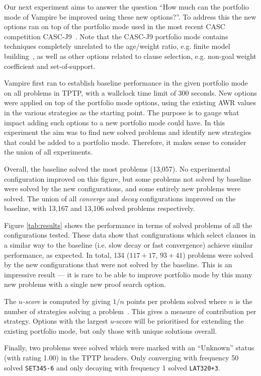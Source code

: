 \documentclass{llncs}
\begin{document}
Our next experiment aims to answer the question ``How much can the portfolio mode of Vampire be improved using these new options?''.
To address this the new options ran on top of the portfolio mode used in the most recent CASC competition CASC-J9~\cite{CASC}.
Note that the CASC-J9 portfolio mode contains techniques completely unrelated to the age/weight ratio, e.g. finite model building~\cite{fmb}, as well as other options related to clause selection, e.g. non-goal weight coefficient and set-of-support.

Vampire first ran to establish baseline performance in the given portfolio mode on all problems in TPTP, with a wallclock time limit of 300 seconds.
New options were applied on top of the portfolio mode options, using the existing AWR values in the various strategies as the starting point.
The purpose is to gauge what impact adding such options to a new portfolio mode could have.
In this experiment the aim was to find new solved problems and identify new strategies that could be added to a portfolio mode.
Therefore, it makes sense to consider the union of all experiments.

Overall, the baseline solved the most problems (13,057). 
No experimental configuration improved on this figure, but some problems not solved by baseline were solved by the new configurations, and some entirely new problems were solved.
The union of all \emph{converge} and \emph{decay} configurations improved on the baseline, with 13,167 and 13,106 solved problems respectively.

Figure \ref{tab:results} shows the performance in terms of solved problems of all the configurations tested.
These data show that configurations which select clauses in a similar way to the baseline (i.e. slow decay or fast convergence) achieve similar performance, as expected.
In total, 134 (\(117 + 17\), \(93 + 41\))  problems were solved by the new configurations that were not solved by the baseline. This is an impressive result --- it is rare to be able to improve portfolio mode by this many new problems with a single new proof search option.  

The \emph{\(u\)-score} is computed by giving $1/n$ points per problem solved where $n$ is the number of strategies solving a problem~\cite{u-score}.
This gives a measure of contribution per strategy.
Options with the largest \(u\)-score will be prioritised for extending the existing portfolio mode, but only those with unique solutions overall.

Finally, two problems were solved which were marked with an ``Unknown'' status (with rating 1.00) in the TPTP headers.
Only converging with frequency 50 solved \texttt{SET345-6} and only decaying with frequency 1 solved \texttt{LAT320+3}.
\end{document}
